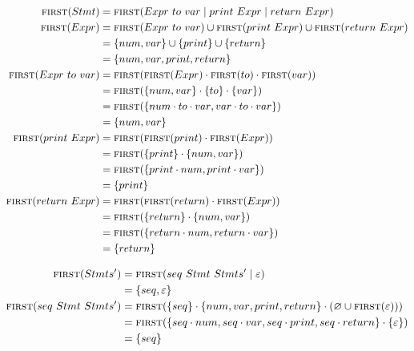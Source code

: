 \documentclass{report}
\newcommand{\Empty}{\varnothing}
\newcommand{\Null}{\varepsilon}
\newcommand{\Seq}{\cdot}
\newcommand{\Spc}{\ }
\newcommand{\Union}{\mathrel{|}}
\newcommand{\FIRST}{\textsc{first}}
\newcommand{\NT}[1]{{#1}}
\newcommand{\T}[1]{{#1}}
\begin{document}
\begin{equation*}
  \begin{aligned}
    \FIRST(\NT{Stmt}) &= \FIRST(\NT{Expr} \Spc \T{to} \Spc \T{var} \Union \T{print} \Spc \NT{Expr} \Union \NT{return} \Spc \NT{Expr})\\
    \FIRST(\NT{Expr}) &= \FIRST(\NT{Expr} \Spc \T{to} \Spc \T{var}) \cup \FIRST(\T{print} \Spc \NT{Expr}) \cup \FIRST(\NT{return} \Spc \NT{Expr})\\
    &= \{\T{num}, \T{var}\} \cup \{\T{print}\} \cup \{\T{return}\}\\
    &= \{\T{num}, \T{var}, \T{print}, \T{return}\}\\
    \FIRST(\NT{Expr} \Spc \T{to} \Spc \T{var}) &= \FIRST(\FIRST(\NT{Expr}) \Seq \FIRST(\T{to}) \Seq \FIRST(\T{var}))\\
    &= \FIRST(\{\T{num}, \T{var}\} \Seq \{\T{to}\} \Seq \{\T{var}\})\\
    &= \FIRST(\{\T{num} \Seq \T{to} \Seq \T{var}, \T{var} \Seq \T{to} \Seq \T{var}\})\\
    &= \{\T{num}, \T{var}\}\\
    \FIRST(\T{print} \Spc \NT{Expr}) &= \FIRST(\FIRST(\T{print}) \Seq \FIRST(\NT{Expr}))\\
    &= \FIRST(\{\T{print}\} \Seq \{\T{num}, \T{var}\})\\
    &= \FIRST(\{\T{print}\Seq\T{num}, \T{print} \Seq \T{var}\})\\
    &= \{\T{print}\}\\
    \FIRST(\T{return} \Spc \NT{Expr}) &= \FIRST(\FIRST(\T{return}) \Seq \FIRST(\NT{Expr}))\\
    &= \FIRST(\{\T{return}\} \Seq \{\T{num}, \T{var}\})\\
    &= \FIRST(\{\T{return}\Seq\T{num}, \T{return} \Seq \T{var}\})\\
    &= \{\T{return}\}
  \end{aligned}
\end{equation*}

\begin{equation*}
  \begin{aligned}
    \FIRST(\NT{Stmts'}) &= \FIRST(\T{seq} \Spc \NT{Stmt} \Spc \NT{Stmts'} \Union \Null)\\
    & = \{\T{seq}, \Null\}\\
    \FIRST(\T{seq} \Spc \NT{Stmt} \Spc \NT{Stmts'}) &= \FIRST(\{\T{seq}\} \Seq \{\T{num}, \T{var}, \T{print}, \T{return}\} \Seq (\Empty \cup \FIRST(\Null)))\\
    &= \FIRST(\{\T{seq} \Seq \T{num}, \T{seq} \Seq \T{var}, \T{seq} \Seq \T{print}, \T{seq} \Seq \T{return}\} \Seq \{\Null\})\\
    &= \{\T{seq}\}
  \end{aligned}
\end{equation*}
\end{document}
